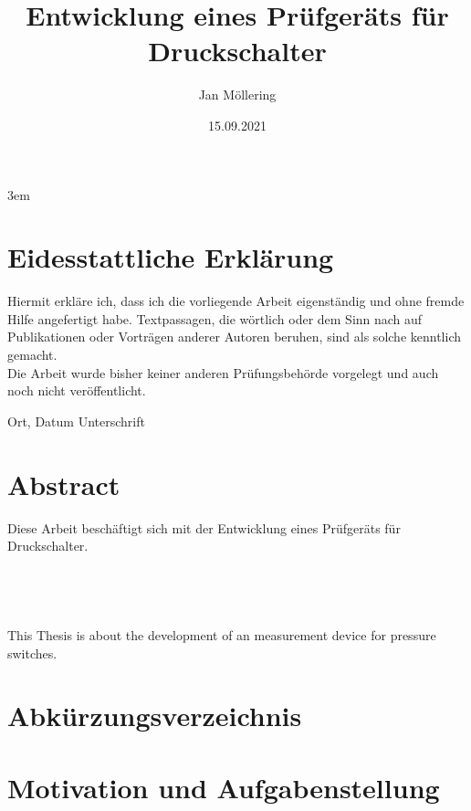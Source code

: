 \documentclass[12pt,a4paper,twoside]{report}
\title{Entwicklung eines Prüfgeräts für Druckschalter}
\author{Jan Möllering}
\date{15.09.2021}
\begin{document}
\emergencystretch 3em



\chapter*{Eidesstattliche Erklärung}
\thispagestyle{empty}
Hiermit erkläre ich, dass ich die vorliegende Arbeit eigenständig und ohne fremde Hilfe angefertigt habe. Textpassagen,
die wörtlich oder dem Sinn nach auf Publikationen oder Vorträgen anderer Autoren beruhen, sind als solche kenntlich gemacht.
\\
\noindent
Die Arbeit wurde bisher keiner anderen Prüfungsbehörde vorgelegt und auch noch nicht veröffentlicht.

\vspace{4cm}

\hspace{2cm} Ort, Datum \hfill Unterschrift \hspace{2cm}

\chapter*{Abstract}
\thispagestyle{empty}
Diese Arbeit beschäftigt sich mit der Entwicklung eines Prüfgeräts für Druckschalter.
\\
\\
\\
\\
\\
This Thesis is about the development of an measurement device for pressure switches.

\setcounter{tocdepth}{2}
\tableofcontents
\thispagestyle{empty}
\newpage
{}


\listoftables
\newpage

\listoffigures

\chapter*{Abkürzungsverzeichnis}

\newpage

\chapter{Motivation und Aufgabenstellung}
\setcounter{page}{1}

\end{document}
